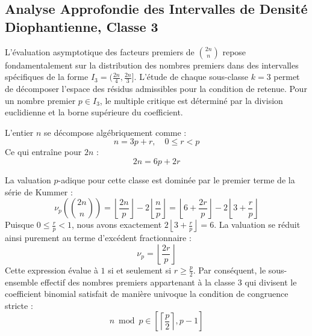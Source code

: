 \documentclass[12pt,a4paper]{article}
\begin{document}
    \newpage
    \subsection{Analyse Approfondie des Intervalles de Densité Diophantienne, Classe 3}
    L'évaluation asymptotique des facteurs premiers de $\binom{2n}{n}$ repose fondamentalement sur la distribution des nombres premiers dans des intervalles spécifiques de la forme $I_3 = (\frac{2n}{4}, \frac{2n}{3}]$.
    L'étude de chaque sous-classe $k = 3$ permet de décomposer l'espace des résidus admissibles pour la condition de retenue.
    Pour un nombre premier $p \in I_3$, le multiple critique est déterminé par la division euclidienne et la borne supérieure du coefficient.

    L'entier $n$ se décompose algébriquement comme :
    \begin{equation}
    n = 3 p + r, \quad 0 \le r < p
    \end{equation}
    Ce qui entraîne pour $2n$ :
    \begin{equation}
    2n = 6 p + 2r
    \end{equation}

    La valuation $p$-adique pour cette classe est dominée par le premier terme de la série de Kummer :
    \begin{equation}
    \nu_p\left( \binom{2n}{n} \right) = \left\lfloor \frac{2n}{p} \right\rfloor - 2 \left\lfloor \frac{n}{p} \right\rfloor = \left\lfloor 6 + \frac{2r}{p} \right\rfloor - 2 \left\lfloor 3 + \frac{r}{p} \right\rfloor
    \end{equation}
    Puisque $0 \le \frac{r}{p} < 1$, nous avons exactement $2 \left\lfloor 3 + \frac{r}{p} \right\rfloor = 6$.
    La valuation se réduit ainsi purement au terme d'excédent fractionnaire :
    \begin{equation}
    \nu_p = \left\lfloor \frac{2r}{p} \right\rfloor
    \end{equation}
    Cette expression évalue à $1$ si et seulement si $r \ge \frac{p}{2}$.
    Par conséquent, le sous-ensemble effectif des nombres premiers appartenant à la classe $3$ qui divisent le coefficient binomial satisfait de manière univoque la condition de congruence stricte :
    \begin{equation}
    n \bmod p \in \left[ \left\lceil \frac{p}{2} \right\rceil, p - 1 \right]
    \end{equation}
\end{document}

